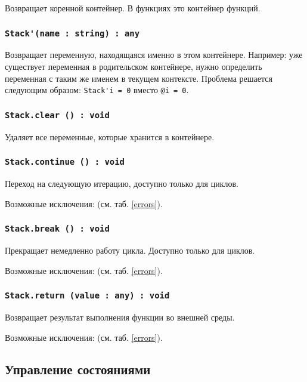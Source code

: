 Возвращает коренной контейнер. В функциях это контейнер функций.

\subsubsection{\lstinline|Stack'(name : string) : any|}

Возвращает переменную, находящаяся именно в этом контейнере. Например: уже существует переменная  в родительском контейнере, нужно определить переменная с таким же именем в текущем контексте. Проблема решается следующим образом: \lstinline|Stack'i = 0| вместо \lstinline|@i = 0|.

\subsubsection{\lstinline|Stack.clear () : void|}

Удаляет все переменные, которые хранится в контейнере.

\subsubsection{\lstinline|Stack.continue () : void|}

Переход на следующую итерацию, доступно только для циклов.

Возможные исключения:  (см. таб. \ref{errors}).

\subsubsection{\lstinline|Stack.break () : void|}

Прекращает немедленно работу цикла. Доступно только для циклов.

Возможные исключения:  (см. таб. \ref{errors}).

\subsubsection{\lstinline|Stack.return (value : any) : void|}

Возвращает результат выполнения функции во внешней среды.

Возможные исключения:  (см. таб. \ref{errors}).

\subsection{Управление состояниями}

